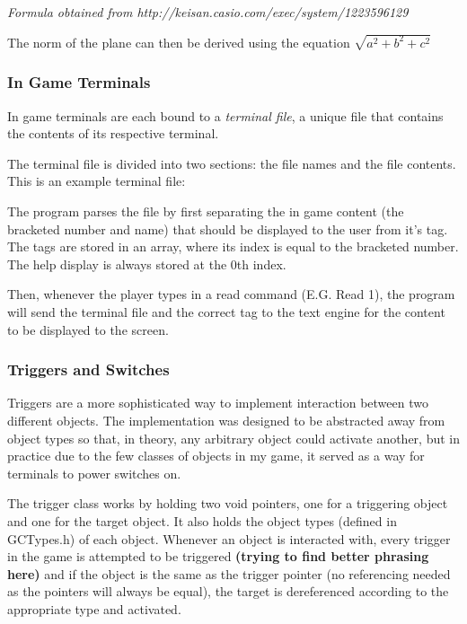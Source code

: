\documentclass{article}
\begin{document}
\emph{\tiny{Formula obtained from http://keisan.casio.com/exec/system/1223596129}}

The norm of the plane can then be derived using the equation $\sqrt{a^2 + b^2 + c^2}$

\subsubsection{In Game Terminals}
In game terminals are each bound to a \emph{terminal file}, a unique file that contains the contents of its respective terminal.

The terminal file is divided into two sections: the file names and the file contents. This is an example terminal file:



The program parses the file by first separating the in game content (the bracketed number and name) that should be displayed to the user from it's tag. The tags are stored in an array, where its index is equal to the bracketed number. The help display is always stored at the 0th index.

Then, whenever the player types in a read command (E.G. Read 1), the program will send the terminal file and the correct tag to the text engine for the content to be displayed to the screen.

\subsubsection{Triggers and Switches}
Triggers are a more sophisticated way to implement interaction between two different objects. The implementation was designed to be abstracted away from object types so that, in theory, any arbitrary object could activate another, but in practice due to the few classes of objects in my game, it served as a way for terminals to power switches on. 

The trigger class works by holding two void pointers, one for a triggering object and one for the target object. It also holds the object types (defined in GCTypes.h) of each object. Whenever an object is interacted with, every trigger in the game is attempted to be triggered \textbf{(trying to find better phrasing here)} and if the object is the same as the trigger pointer (no referencing needed as the pointers will always be equal), the target is dereferenced according to the appropriate type and activated.
\end{document}
